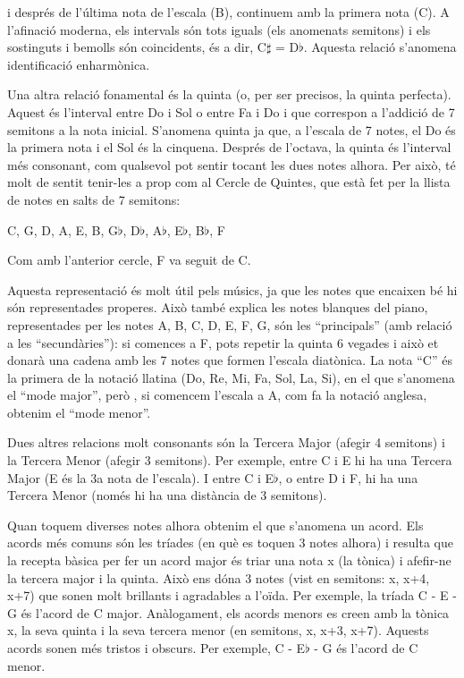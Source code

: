 i després de l'última nota de l'escala (B), continuem amb la primera nota (C). A l'afinació moderna, els intervals són tots iguals (els anomenats semitons) i els sostinguts i bemolls són coincidents, és a dir, C$\sharp$ = D$\flat$. Aquesta relació s'anomena identificació enharmònica.

Una altra relació fonamental és la quinta (o, per ser precisos, la quinta perfecta). Aquest és l'interval entre Do i Sol o entre Fa i Do i que correspon a l'addició de 7 semitons a la nota inicial. S'anomena quinta ja que, a l'escala de 7 notes, el Do és la primera nota i el Sol és la cinquena. Després de l'octava, la quinta és l'interval més consonant, com qualsevol pot sentir tocant les dues notes alhora. Per això, té molt de sentit tenir-les a prop com al Cercle de Quintes, que està fet per la llista de notes en salts de 7 semitons:
\begin{center}
C, G, D, A, E, B, G$\flat$, D$\flat$, A$\flat$, E$\flat$, B$\flat$, F
\end{center}
Com amb l'anterior cercle, F va seguit de C.

Aquesta representació és molt útil pels músics, ja que les notes que encaixen bé hi són representades properes. Això també explica les notes blanques del piano, representades per les notes A, B, C, D, E, F, G, són les   ``principals'' (amb relació a les ``secundàries''): si comences a F, pots repetir la quinta 6 vegades i això et donarà una cadena amb les 7 notes que formen l'escala diatònica. La nota ``C'' és la primera de la notació llatina (Do, Re, Mi, Fa, Sol, La, Si), en el que s'anomena el ``mode major'', però , si comencem l'escala a A, com fa la notació anglesa, obtenim el ``mode menor''.

Dues altres relacions molt consonants són la Tercera Major (afegir 4 semitons) i la Tercera Menor (afegir 3 semitons). Per exemple, entre C i E hi ha una Tercera Major (E és la 3a nota de l'escala). I entre C i E$\flat$, o entre D i F, hi ha una Tercera Menor (només hi ha una distància de 3 semitons).

Quan toquem diverses notes alhora obtenim el que s'anomena un acord. Els acords més comuns són les tríades (en què es toquen 3 notes alhora) i resulta que la recepta bàsica per fer un acord major és triar una nota x (la tònica) i afefir-ne la tercera major i la quinta. Això ens dóna 3 notes (vist en semitons: x, x+4, x+7) que sonen molt brillants i agradables a l'oïda. Per exemple, la tríada C - E - G és l'acord de C major. Anàlogament, els acords menors es creen amb la tònica x, la seva quinta i la seva tercera menor (en semitons, x, x+3, x+7). Aquests acords sonen més tristos i obscurs. Per exemple, C - E$\flat$ - G és l'acord de C menor.

